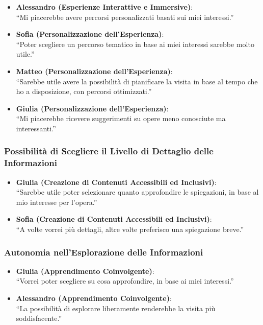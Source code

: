 \documentclass{article}
\begin{document}
\begin{itemize}
    \item \textbf{Alessandro (Esperienze Interattive e Immersive)}:\\
    ``Mi piacerebbe avere percorsi personalizzati basati sui miei interessi.''
    \item \textbf{Sofia (Personalizzazione dell'Esperienza)}:\\
    ``Poter scegliere un percorso tematico in base ai miei interessi sarebbe molto utile.''
    \item \textbf{Matteo (Personalizzazione dell'Esperienza)}:\\
    ``Sarebbe utile avere la possibilità di pianificare la visita in base al tempo che ho a disposizione, con percorsi ottimizzati.''
    \item \textbf{Giulia (Personalizzazione dell'Esperienza)}:\\
    ``Mi piacerebbe ricevere suggerimenti su opere meno conosciute ma interessanti.''
\end{itemize}

\subsubsection{Possibilità di Scegliere il Livello di Dettaglio delle Informazioni}

\begin{itemize}
    \item \textbf{Giulia (Creazione di Contenuti Accessibili ed Inclusivi)}:\\
    ``Sarebbe utile poter selezionare quanto approfondire le spiegazioni, in base al mio interesse per l'opera.''
    \item \textbf{Sofia (Creazione di Contenuti Accessibili ed Inclusivi)}:\\
    ``A volte vorrei più dettagli, altre volte preferisco una spiegazione breve.''
\end{itemize}

\subsubsection{Autonomia nell'Esplorazione delle Informazioni}

\begin{itemize}
    \item \textbf{Giulia (Apprendimento Coinvolgente)}:\\
    ``Vorrei poter scegliere su cosa approfondire, in base ai miei interessi.''
    \item \textbf{Alessandro (Apprendimento Coinvolgente)}:\\
    ``La possibilità di esplorare liberamente renderebbe la visita più soddisfacente.''
\end{itemize}
\end{document}
